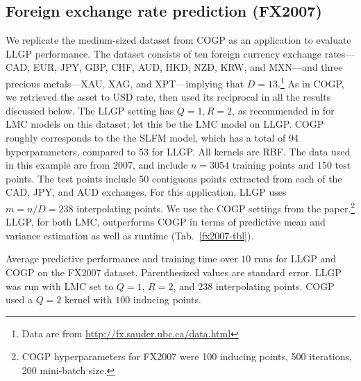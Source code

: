 \documentclass{article}
\begin{document}
\subsection{Foreign exchange rate prediction (FX2007)}\label{fx2007-results}

We replicate the medium-sized dataset from COGP as an application to evaluate LLGP performance. The dataset consists of ten foreign currency exchange rates---CAD, EUR, JPY, GBP, CHF, AUD, HKD, NZD, KRW, and MXN---and three precious metals---XAU, XAG, and XPT---implying that $D=13$.\footnote{Data are from \url{http://fx.sauder.ubc.ca/data.html}} As in COGP, we retrieved the asset to USD rate, then used its reciprocal in all the results discussed below. The LLGP setting has $Q=1,R=2$, as recommended in \cite{alvarez2010efficient} for LMC models on this dataset; let this be the LMC model on LLGP. COGP roughly corresponds to the the SLFM model, which has a total of 94 hyperparameters, compared to 53 for LLGP. All kernels are RBF. The data used in this example are from 2007, and include $n=3054$ training points and $150$ test points. The test points include 50 contiguous points extracted from each of the CAD, JPY, and AUD exchanges. For this application, LLGP uses $m=n/D=238$ interpolating points. We use the COGP settings from the paper.\footnote{COGP hyperparameters for FX2007 were 100 inducing points, 500 iterations, 200 mini-batch size.} LLGP, for both LMC, outperforms COGP in terms of predictive mean and variance estimation as well as runtime (Tab.~\ref{fx2007-tbl}).

\begin{table}[!h]
  \caption{Average predictive performance and training time over $10$ runs for LLGP and COGP on the FX2007 dataset. Parenthesized values are standard error. LLGP was run with LMC set to $Q=1$, $R=2$, and $238$ interpolating points. COGP used a $Q=2$ kernel with $100$ inducing points.}
\label{fx2007-tbl}
\begin{center}
  \begin{small}
    \begin{sc}
      
\end{sc}
\end{small}
\end{center}
\end{table}
\end{document}
